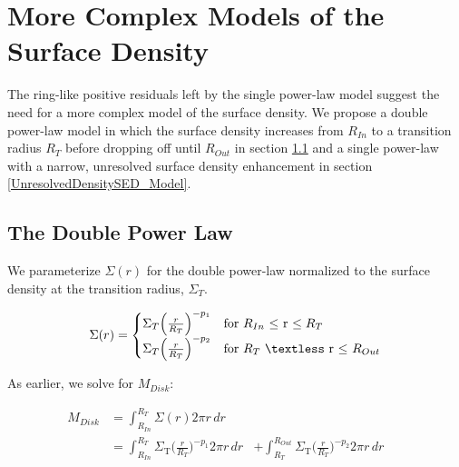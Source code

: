 
\section{More Complex Models of the Surface Density}
\label{MoreComplexModels}

The ring-like positive residuals left by the single power-law model suggest the need for a more complex model of the surface density. We propose a double power-law model in which the surface density increases from $R_{In}$ to a transition radius $R_{T}$ before dropping off until $R_{Out}$ in section \ref{DoublePowerSED_Model} and a single power-law with a narrow, unresolved surface density enhancement in section \ref{UnresolvedDensitySED_Model}.

\subsection{The Double Power Law}
\label{DoublePowerSED_Model}

We parameterize $\Sigma(r)$ for the double power-law normalized to the surface density at the transition radius, $\Sigma_{T}$. 

\begin{equation}\label{eq:sigmaDP}
\Sigma(r) = \begin{cases}
   \Sigma_{T}\Big(\frac{r}{R_{T}}\Big)^{-p_{1}} & \text{for $R_{In}$ $\le$ r $\le R_{T}$} \\
   \Sigma_{T}\Big(\frac{r}{R_{T}}\Big)^{-p_{2}} & \text{for $R_{T}$ $\textless$ r $\le$ $R_{Out}$}
\end{cases}
\end{equation}

As earlier, we solve for $M_{Disk}$:

\begin{equation}\label{eq:mdiskDP}
\begin{flalign*}
    M_{Disk} &= \int_{R_{In}}^{R_{T}} \Sigma(r) 2 \pi r \,dr & \\
    &= \int_{R_{In}}^{R_{T}} \Sigma_{\text{T}}\Big(\frac{r}{R_{T}}\Big)^{-p_{1}} 2 \pi r \,dr & + \int_{R_{T}}^{R_{Out}} \Sigma_{\text{T}}\Big(\frac{r}{R_{T}}\Big)^{-p_{2}} 2 \pi r \,dr &&
\end{flalign*}
\end{equation}

